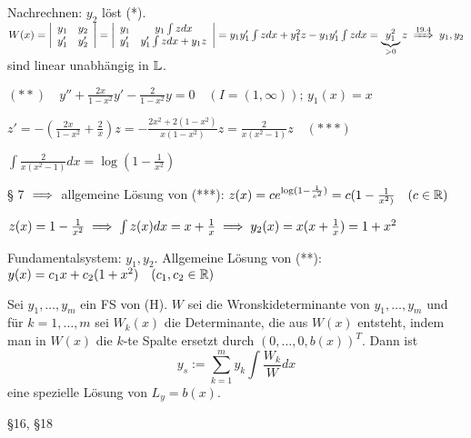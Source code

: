 \documentclass{article}
\begin{document}
\begin{beweis}
Nachrechnen: $y_2$ löst (*).
$W(x)=\left|\begin{array}{cc} y_1 & y_2 \\ y_1' & y_2'\end{array}\right| =
\left|\begin{array}{cc} y_1 & y_1\int zdx \\ y_1' & y_1'\int zdx + y_1 z
\end{array}\right| =\\ y_1y_1'\int zdx+y_1^2z-y_1y_1'\int zdx = 
\underbrace{y_1^2}_{>0}z \folgtnach{19.4} y_1, y_2$ sind linear unabhängig in
$\mathbb{L}$.

\end{beweis}

\begin{beispiel}
$(**)\quad y''+\frac{2x}{1-x^2}y'-\frac{2}{1-x^2}y = 0\quad (I=(1,\infty)); \, y_1(x)=x$

$z'=-(\frac{2x}{1-x^2}+\frac{2}{x})z = - \frac{2x^2+2(1-x^2)}{x(1-x^2)}z = \frac{2}{x(x^2-1)}z\quad (***)$

$\int \frac{2}{x(x^2-1)}dx = \log (1-\frac{1}{x^2})$

§ 7 $\implies$ allgemeine Lösung von (***): $z(x) = c e^{\log (1-\frac{1}{x^2})} = c(1-\frac{1}{x^2)} \quad (c \in \mathbb{R})$

$z(x) = 1 - \frac{1}{x^2} \implies \int z(x) dx = x + \frac{1}{x} \implies y_2(x) = x(x+\frac{1}{x}) = 1 + x^2$

Fundamentalsystem: $y_1, y_2$. Allgemeine Lösung von (**): $y(x) = c_1x+c_2(1+x^2)\quad (c_1, c_2 \in \mathbb{R})$
\end{beispiel}

\begin{satz} %
Sei $y_1, \ldots, y_m$ ein FS von (H). $W$ sei die Wronskideterminante von $y_1, \ldots, y_m$ und für $k=1, \ldots, m$ sei $W_k(x)$ die Determinante, die aus $W(x)$ entsteht, indem man in $W(x)$ die $k$-te Spalte ersetzt durch $(0, \ldots, 0, b(x))^T$. Dann ist
$$y_s:=\sum_{k=1}^{m}y_k\int\frac{W_k}{W}dx$$
eine spezielle Lösung von $L_y = b(x)$.
\end{satz}

\begin{beweis}
§16, §18
\end{beweis}
\end{document}

